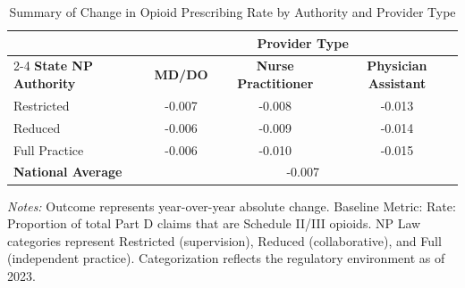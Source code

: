 \begin{table}[htbp]
    \centering
    \caption{Summary of Change in Opioid Prescribing Rate by Authority and Provider Type}
    \label{tab:d_partd_opioid_rate_provtype}
    \vspace{0.2cm}
    \begin{tabular}{lccc}
        \toprule
        & \multicolumn{3}{c}{\textbf{Provider Type}} \\
        \cmidrule(lr){2-4}
        \textbf{State NP Authority} & \textbf{MD/DO} & \textbf{Nurse Practitioner} & \textbf{Physician Assistant} \\
        \midrule
        Restricted & -0.007 & -0.008 & -0.013 \\
        Reduced & -0.006 & -0.009 & -0.014 \\
        Full Practice & -0.006 & -0.010 & -0.015 \\
        \midrule
        \textbf{National Average} & \multicolumn{3}{c}{-0.007} \\
        \bottomrule
    \end{tabular}
    \vspace{0.1cm}
    \begin{minipage}{0.85\textwidth}
        \footnotesize \textit{Notes:} Outcome represents year-over-year absolute change. Baseline Metric: Rate: Proportion of total Part D claims that are Schedule II/III opioids. NP Law categories represent Restricted (supervision), Reduced (collaborative), and Full (independent practice). Categorization reflects the regulatory environment as of 2023.
    \end{minipage}
\end{table}